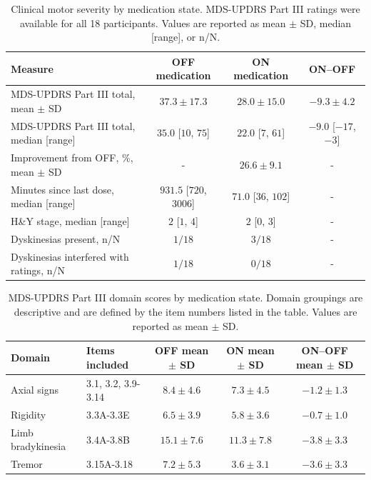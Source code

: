 \documentclass[utf8]{frontiers_suppmat}
\begin{document}
\begin{table}[!htbp]
\centering
\caption{Clinical motor severity by medication state. MDS-UPDRS Part III ratings were available for all 18 participants. Values are reported as mean $\pm$ SD, median [range], or n/N.}
\label{tab:updrs_summary}

\renewcommand{\arraystretch}{1.3} %

\begin{tabular}{lccc}
\toprule
Measure & OFF medication & ON medication & ON–OFF \\
\midrule
MDS-UPDRS Part III total, mean $\pm$ SD
& $37.3 \pm 17.3$ & $28.0 \pm 15.0$ & $-9.3 \pm 4.2$ \\

MDS-UPDRS Part III total, median [range]
& $35.0$ [$10$, $75$] & $22.0$ [$7$, $61$] & $-9.0$ [$-17$, $-3$] \\

Improvement from OFF, \%, mean $\pm$ SD
& - & $26.6 \pm 9.1$ & - \\

Minutes since last dose, median [range]
& $931.5$ [$720$, $3006$] & $71.0$ [$36$, $102$] & - \\

H\&Y stage, median [range]
& $2$ [$1$, $4$] & $2$ [$0$, $3$] & - \\

Dyskinesias present, n/N
& $1/18$ & $3/18$ & - \\

Dyskinesias interfered with ratings, n/N
& $1/18$ & $0/18$ & - \\
\bottomrule
\end{tabular}
\end{table}

\begin{table}[!htbp]
\centering
\caption{MDS-UPDRS Part III domain scores by medication state. Domain groupings are descriptive and are defined by the item numbers listed in the table. Values are reported as mean $\pm$ SD.}
\label{tab:updrs_domains}
\renewcommand{\arraystretch}{1.3} %
\begin{tabular}{llccc}
\toprule
Domain & Items included & OFF mean $\pm$ SD & ON mean $\pm$ SD & ON–OFF mean $\pm$ SD \\
\midrule
Axial signs & 3.1, 3.2, 3.9-3.14
& $8.4 \pm 4.6$ & $7.3 \pm 4.5$ & $-1.2 \pm 1.3$ \\

Rigidity & 3.3A-3.3E
& $6.5 \pm 3.9$ & $5.8 \pm 3.6$ & $-0.7 \pm 1.0$ \\

Limb bradykinesia & 3.4A-3.8B
& $15.1 \pm 7.6$ & $11.3 \pm 7.8$ & $-3.8 \pm 3.3$ \\

Tremor & 3.15A-3.18
& $7.2 \pm 5.3$ & $3.6 \pm 3.1$ & $-3.6 \pm 3.3$ \\
\bottomrule
\end{tabular}
\end{table}
\end{document}
